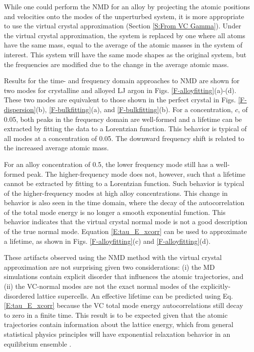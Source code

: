 While one could perform the NMD for an alloy by projecting 
the atomic positions and velocities onto the modes of the unperturbed 
system, it is more appropriate to use the virtual crystal approximation 
(Section \ref{S:From VC Gamma}). 
Under the virtual 
crystal approximation, the system is replaced by one where all atoms 
have the same mass, equal to the average of the atomic masses in the 
system of interest. This system will have the same mode shapes as the 
original system, but the frequencies are modified due to the change 
in the average atomic mass.

Results for the time- and frequency domain approaches to NMD 
are shown for two modes for crystalline and alloyed LJ argon in 
Figs. \ref{F-alloyfitting}(a)-(d). These two modes are equivalent to 
those shown in the perfect crystal in 
Figs. \ref{F-dispersion}(b), \ref{F-bulkfitting}(a), and 
\ref{F-bulkfitting}(b). For a concentration, $c$, of 0.05, both peaks 
in the frequency domain are well-formed and a lifetime can be extracted 
by fitting the data to a Lorentzian function. This behavior is typical 
of all modes at a concentration of 0.05. The downward frequency shift 
is related to the increased average atomic mass.

For an alloy concentration of 0.5, the lower frequency mode still has 
a well-formed peak. The higher-frequency mode does not, however, such 
that a lifetime cannot be extracted by fitting to a Lorentzian function. 
Such behavior is typical of the higher-frequency modes at high alloy 
concentrations. This change in behavior is also seen in the time domain, 
where the decay of the autocorrelation of the total mode energy is no 
longer a smooth exponential function. This behavior indicates that the 
virtual crystal normal mode is not a good description of the true 
normal mode. Equation \eqref{E:tau_E_xcorr} can be used to approximate a 
lifetime, as shown in Figs. \ref{F-alloyfitting}(c) and 
\ref{F-alloyfitting}(d).

These artifacts observed using the NMD method with the virtual crystal 
approximation are not surprising given two considerations: 
(i) the MD simulations 
contain explicit disorder that influences the atomic trajectories, 
and (ii) the VC-normal modes are not the exact normal modes of the 
explicitly-disordered lattice supercells. 
An effective lifetime can be predicted 
using Eq. \eqref{E:tau_E_xcorr} 
because the VC total mode energy autocorrelations 
still decay to zero in a finite time. This result is to be expected 
given that the atomic trajectories contain 
information about the lattice energy, which from general statistical 
physics principles will have exponential relaxation behavior in an 
equilibrium ensemble 
\cite{landau_statistical_1980,srivastava_physics_1990,
rajabpour_thermal_2010}. 

